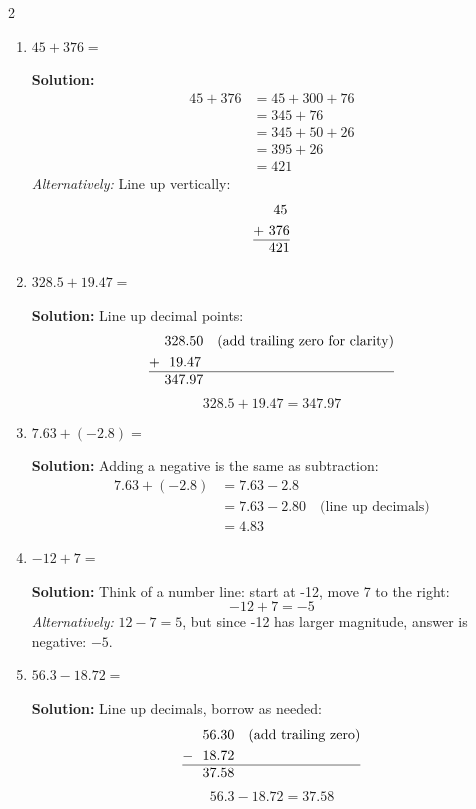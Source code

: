 \documentclass[12pt,a4paper]{article}
\begin{document}
\begin{multicols}{2}
\begin{enumerate}
    \item $45 + 376 =$
    
    \textbf{Solution:}
    \begin{align*}
        45 + 376 &= 45 + 300 + 76 \\
        &= 345 + 76 \\
        &= 345 + 50 + 26 \\
        &= 395 + 26 \\
        &= 421
    \end{align*}
    \textit{Alternatively:} Line up vertically:
    \begin{align*}
        &\ \ 45 \\
        +&\ 376 \\
        \hline
        &\ 421
    \end{align*}
    
    \item $328.5 + 19.47 =$
    
    \textbf{Solution:} Line up decimal points:
    \begin{align*}
        &\ 328.50 \quad \text{(add trailing zero for clarity)} \\
        +&\ \ 19.47 \\
        \hline
        &\ 347.97
    \end{align*}
    \[328.5 + 19.47 = 347.97\]
    
    \item $7.63 + (-2.8) =$
    
    \textbf{Solution:} Adding a negative is the same as subtraction:
    \begin{align*}
        7.63 + (-2.8) &= 7.63 - 2.8 \\
        &= 7.63 - 2.80 \quad \text{(line up decimals)} \\
        &= 4.83
    \end{align*}
    
    \item $-12 + 7 =$
    
    \textbf{Solution:} Think of a number line: start at -12, move 7 to the right:
    \[-12 + 7 = -5\]
    \textit{Alternatively:} $12 - 7 = 5$, but since -12 has larger magnitude, answer is negative: $-5$.
    
    \item $56.3 - 18.72 =$
    
    \textbf{Solution:} Line up decimals, borrow as needed:
    \begin{align*}
        &\ \ 56.30 \quad \text{(add trailing zero)} \\
        -&\ \ 18.72 \\
        \hline
        &\ \ 37.58
    \end{align*}
    \[56.3 - 18.72 = 37.58\]
    

\end{enumerate}
\end{multicols}
\end{document}
